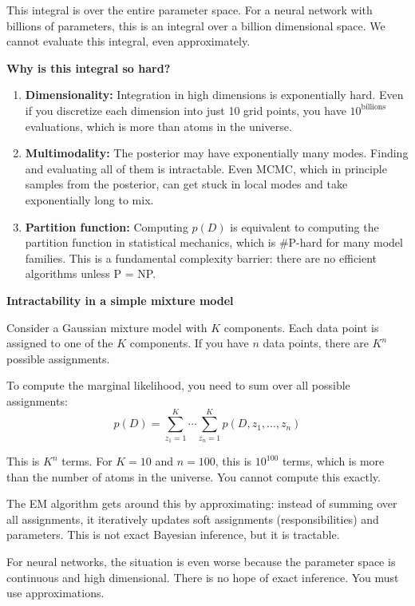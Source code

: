 This integral is over the entire parameter space. For a neural network with billions of parameters, this is an integral over a billion dimensional space. We cannot evaluate this integral, even approximately.

\textbf{Why is this integral so hard?}

\begin{enumerate}
\item \textbf{Dimensionality:} Integration in high dimensions is exponentially hard. Even if you discretize each dimension into just 10 grid points, you have $10^{\text{billions}}$ evaluations, which is more than atoms in the universe.

\item \textbf{Multimodality:} The posterior may have exponentially many modes. Finding and evaluating all of them is intractable. Even MCMC, which in principle samples from the posterior, can get stuck in local modes and take exponentially long to mix.

\item \textbf{Partition function:} Computing $p(D)$ is equivalent to computing the partition function in statistical mechanics, which is \#P-hard for many model families. This is a fundamental complexity barrier: there are no efficient algorithms unless P = NP.
\end{enumerate}

\vspace{1.5em}

\begin{examplebox}
\textbf{Intractability in a simple mixture model}

\vspace{0.5em}

Consider a Gaussian mixture model with $K$ components. Each data point is assigned to one of the $K$ components. If you have $n$ data points, there are $K^n$ possible assignments.

\vspace{0.5em}

To compute the marginal likelihood, you need to sum over all possible assignments:
\begin{equation*}
p(D) = \sum_{z_1=1}^{K} \cdots \sum_{z_n=1}^{K} p(D, z_1, \ldots, z_n)
\end{equation*}

This is $K^n$ terms. For $K=10$ and $n=100$, this is $10^{100}$ terms, which is more than the number of atoms in the universe. You cannot compute this exactly.

\vspace{0.5em}

The EM algorithm gets around this by approximating: instead of summing over all assignments, it iteratively updates soft assignments (responsibilities) and parameters. This is not exact Bayesian inference, but it is tractable.

\vspace{0.5em}

For neural networks, the situation is even worse because the parameter space is continuous and high dimensional. There is no hope of exact inference. You must use approximations.
\end{examplebox}

